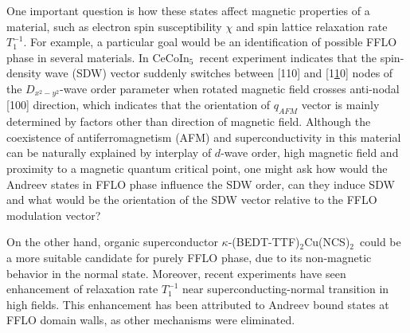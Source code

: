 \documentclass[prb,aps,showpacs,amsmath,twocolumn,10pt]{revtex4-1}
\newcommand{\cecoin}{CeCoIn$_5$}
\newcommand{\kbtf}{$\kappa$-(BEDT-TTF)$_2$Cu(NCS)$_2$}
\begin{document}
One important question is how these states affect magnetic properties of a material, such as 
electron spin susceptibility $\chi$ and spin lattice relaxation rate $T_1^{-1}$. 
For example, a particular goal would be an identification of possible FFLO phase in several materials. 
In \cecoin\ recent experiment\cite{Gerber2014} indicates that the spin-density wave (SDW) vector suddenly switches between 
[110] and [1\underline{1}0] nodes of the $D_{x^2-y^2}$-wave order parameter 
when rotated magnetic field crosses anti-nodal [100] direction, which indicates that the orientation of 
$q_{AFM}$ vector is mainly determined by factors other than direction of magnetic field. 
Although the coexistence of antiferromagnetism (AFM) and superconductivity in this material\cite{cecoin5_Kenzelmann,
cecoin5_Kenzelmann2} can be naturally explained by interplay of $d$-wave order, high magnetic field and 
proximity to a magnetic quantum critical point,\cite{Ikeda:2010eo,sc_afm_kato,Rosemeyer2014} 
one might ask how would the Andreev states in FFLO phase influence the SDW order, can they induce SDW 
and what would be the orientation of the SDW vector relative to the FFLO modulation vector? 

On the other hand, organic superconductor \kbtf\ could be a more suitable candidate for purely FFLO phase, due to its
non-magnetic behavior in the normal state. 
Moreover, recent experiments\cite{Mayaffre2014} have seen enhancement of relaxation rate $T_1^{-1}$ near superconducting-normal
transition in high fields. This enhancement has been attributed to Andreev bound states at FFLO domain walls, 
as other mechanisms were eliminated.\cite{Mayaffre2014} 
\end{document}
